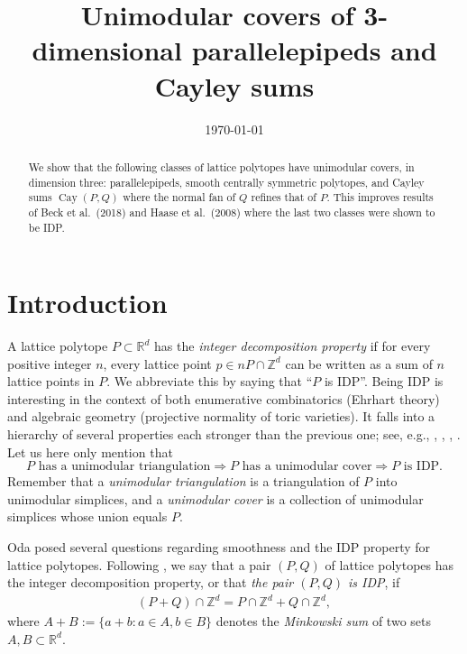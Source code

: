 \documentclass{amsart}
\date{\today}
\title{Unimodular covers of 3-dimensional parallelepipeds and Cayley sums}
\author{}
\theoremstyle{plain}
\theoremstyle{definition}
\newcommand{\Z}{ \ensuremath{\mathbb{Z}}}
\newcommand{\R}{ \ensuremath{\mathbb{R}}}
\newcommand{\cayley}{\operatorname{Cay}}
\begin{document}
\begin{abstract}
We show that the following classes of lattice polytopes have unimodular covers, in dimension three:  parallelepipeds,  smooth centrally symmetric polytopes, and  Cayley sums $\cayley(P,Q)$ where the normal fan of $Q$ refines that of $P$. This improves results of Beck et al.~(2018) and Haase et al.~(2008) where the last two classes were shown to be IDP.
\end{abstract}

\maketitle


\section{Introduction}

A lattice polytope $P\subset \R^d$ has the \emph{integer decomposition property} if for every positive integer $n$, every lattice point $p \in nP\cap \Z^d$ can be written as a sum of $n$ lattice points in $P$. We abbreviate this by saying that ``$P$ is IDP''. Being IDP is interesting in the context of  both enumerative combinatorics (Ehrhart theory) and algebraic geometry (projective normality of toric
varieties). It falls into a hierarchy of several properties each stronger than the previous one; see, e.g., \cite[Section 2.D]{BGbook}, \cite[Sect. 1.2.5]{HPPS-survey}, \cite[p. 2097]{mfo2004}, \cite[p. 2313]{mfo2007}.
Let us here only mention that
\[
P \text{ has a unimodular triangulation}\Rightarrow
P \text{ has a unimodular cover}\Rightarrow
P \text{ is IDP.}
\]
Remember that a \emph{unimodular triangulation} is a triangulation of $P$ into unimodular simplices, and a \emph{unimodular cover} is a collection of unimodular simplices whose union equals $P$. 

Oda \cite{Oda1997} posed several questions regarding smoothness and the IDP property for lattice polytopes.
%
Following \cite{HaaseHof, Tsuchiya}, we say that a pair $(P, Q)$ of lattice polytopes has the integer decomposition property, or that \emph{the pair $(P,Q)$ is IDP}, if 
\begin{align*}
\label{eq:mixedIDP}
(P+Q) \cap \Z^d = P \cap \Z^d + Q \cap \Z^d,
\end{align*}
where $A+B :=\{a+b: a\in A, b\in B\}$ denotes the \emph{Minkowski sum} of two sets $A,B\subset \R^d$.
\end{document}
